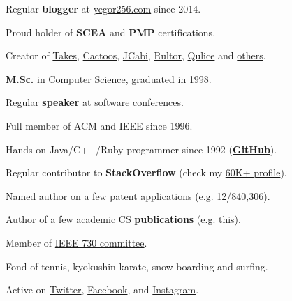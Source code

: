 \documentclass[12pt]{article}
\begin{document}
Regular \textbf{blogger} at \href{http://www.yegor256.com/}{yegor256.com} since 2014.

Proud holder of \textbf{SCEA} and
  \textbf{PMP} certifications.

Creator of \href{http://www.takes.org}{Takes},
  \href{http://www.cactoos.org}{Cactoos},
  \href{http://www.jcabi.com}{JCabi},
  \href{http://www.rultor.com}{Rultor},
  \href{http://www.qulice.com}{Qulice} and
  \href{http://www.yegor256.com/pets.html}{others}.

\textbf{M.Sc.} in Computer Science,
  \href{https://en.wikipedia.org/wiki/Oles_Honchar_Dnipro_National_University}{graduated} in 1998.

Regular \textbf{\href{http://www.yegor256.com/talks.html}{speaker}} at software conferences.

Full member of ACM and IEEE since 1996.

Hands-on Java/C++/Ruby programmer since 1992
  (\textbf{\href{https://github.com/yegor256}{GitHub}}).

Regular contributor to \textbf{StackOverflow}
  (check my \href{https://stackexchange.com/users/63162/yegor256}{60K+ profile}).

Named author on a few patent applications
  (e.g. \href{https://www.google.com/patents/US20120023476}{12/840,306}).

Author of a few academic CS \textbf{publications}
  (e.g. \href{link.springer.com/chapter/10.1007/978-3-642-02152-7_6}{this}).

Member of \href{http://standards.ieee.org/develop/wg/730.html}{IEEE 730 committee}.

Fond of tennis, kyokushin karate, snow boarding and surfing.

Active on
  \href{https://twitter.com/intent/follow?screen_name=yegor256}{Twitter},
  \href{https://www.facebook.com/yegor256}{Facebook},
  and \href{https://instagram.com/yegor256}{Instagram}.
\end{document}
